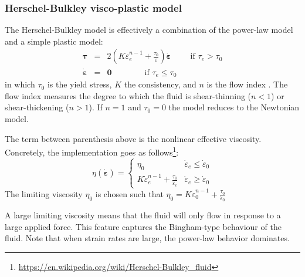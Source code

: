 \subsubsection{Herschel-Bulkley visco-plastic model}

The Herschel-Bulkley model is effectively a combination of the power-law model and 
a simple plastic model:
\begin{eqnarray}
{\bm \tau} &=& 2 \left(  K \dot{\varepsilon}_e^{n-1} 
+ \frac{\tau_0}{\dot{\varepsilon}}\right)\dot{\bm \varepsilon} \qquad \text{ if } {\tau}_{e}>\tau_0 \\
\dot{\bm \varepsilon} &=& {\bm 0} \qquad\qquad \text{if }{\tau}_{e} \leq \tau_0 
\end{eqnarray}
in which $\tau_0$ is the yield stress, $K$ the consistency, and $n$ is the flow index  \cite{demj04}.
The flow index measures the degree to which the fluid is shear-thinning ($n<1$) or shear-thickening ($n>1$).
If $n=1$ and $\tau_0=0$ the model reduces to the Newtonian model. 

The term between parenthesis above is the nonlinear effective viscosity. 
Concretely, the implementation goes as 
follows\footnote{\url{https://en.wikipedia.org/wiki/Herschel-Bulkley_fluid}}:
\begin{equation}
\eta(\dot{\bm \varepsilon}) = 
\left\{
\begin{array}{cc}
\eta_0 & \dot{\varepsilon}_e\leq \dot{\varepsilon}_0 \\ 
K \dot{\varepsilon}_e^{n-1} + \frac{\tau_0}{\dot{\varepsilon}_e} & \dot{\varepsilon}_e \geq \dot{\varepsilon}_0
\end{array}
\right.
\end{equation}
The limiting viscosity $\eta_0$ is chosen such that 
$\eta_0 =  K \dot{\varepsilon}_0^{n-1} + \frac{\tau_0}{\dot{\varepsilon}_0}$

A large limiting viscosity means that the fluid will only flow in response to a large applied force. 
This feature captures the Bingham-type behaviour of the fluid. 
Note that when strain rates are large, the power-law behavior dominates. 

